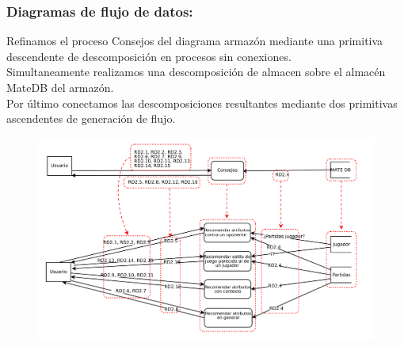 \subsubsection{Diagramas de flujo de datos:}

Refinamos el proceso Consejos del diagrama armazón mediante
una primitiva descendente de descomposición en procesos sin conexiones.\\
Simultaneamente realizamos una descomposición de almacen sobre el
almacén MateDB del armazón.\\
Por último conectamos las descomposiciones resultantes mediante dos
primitivas ascendentes de generación de flujo.\\ 
 
\begin{figure}[H]
\centering
\includegraphics[width=0.7\linewidth]{../Diagramas/pdf/RefinamientoConsejos.pdf}
\caption[Flujo de datos del subsistema Consejos]{}
\caption{}
\label{fig:RefinamientoConsejos}
\end{figure}
